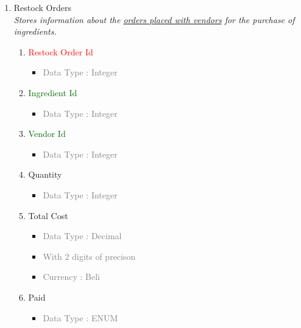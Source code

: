 \begin{enumerate}
        \item Restock Orders \\
        \textit{Stores information about the \underline{orders placed with vendors} for the purchase of ingredients.}
            \begin{enumerate}[label=\alph*.]
                \item\textcolor{red}{Restock Order Id}
                    \begin{itemize}[label=-]
                        \item \textcolor{gray}{Data Type : Integer}
                    \end{itemize}
                \item \textcolor{darkgreen}{Ingredient Id}
                    \begin{itemize}[label=-]
                        \item \textcolor{gray}{Data Type : Integer}
                    \end{itemize}
                \item \textcolor{darkgreen}{Vendor Id}
                    \begin{itemize}[label=-]
                        \item \textcolor{gray}{Data Type : Integer}
                    \end{itemize}
                \item Quantity
                    \begin{itemize}[label=-]
                        \item \textcolor{gray}{Data Type : Integer}
                    \end{itemize}
                \item Total Cost
                    \begin{itemize}[label=-]
                        \item \textcolor{gray}{Data Type : Decimal}
                        \item \textcolor{gray}{With 2 digits of precison}
                        \item \textcolor{gray}{Currency : Beli}
                    \end{itemize}
                \item Paid
                    \begin{itemize}[label=-]
                        \item \textcolor{gray}{Data Type : ENUM}
                    \end{itemize}
            \end{enumerate}
    \end{enumerate}

